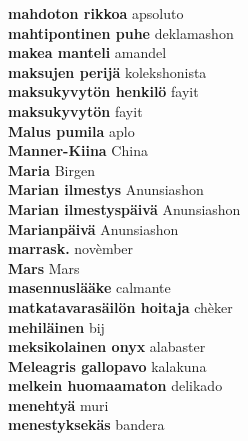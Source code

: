 \textbf{ mahdoton  rikkoa  } apsoluto \\
\textbf{ mahtipontinen puhe  } deklamashon \\
\textbf{ makea manteli  } amandel \\
\textbf{ maksujen perijä  } kolekshonista \\
\textbf{ maksukyvytön henkilö  } fayit \\
\textbf{ maksukyvytön  } fayit \\
\textbf{ Malus pumila  } aplo \\
\textbf{ Manner-Kiina  } China \\
\textbf{ Maria  } Birgen \\
\textbf{ Marian ilmestys  } Anunsiashon \\
\textbf{ Marian ilmestyspäivä  } Anunsiashon \\
\textbf{ Marianpäivä  } Anunsiashon \\
\textbf{ marrask.  } novèmber \\
\textbf{ Mars  } Mars \\
\textbf{ masennuslääke  } calmante \\
\textbf{ matkatavarasäilön hoitaja  } chèker \\
\textbf{ mehiläinen  } bij \\
\textbf{ meksikolainen onyx  } alabaster \\
\textbf{ Meleagris gallopavo  } kalakuna \\
\textbf{ melkein huomaamaton  } delikado \\
\textbf{ menehtyä  } muri \\
\textbf{ menestyksekäs  } bandera \\
